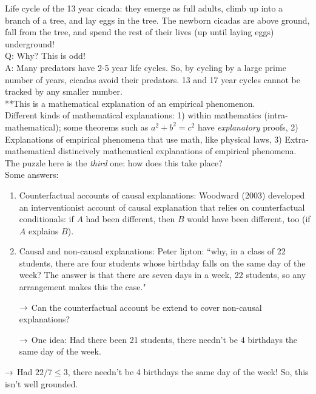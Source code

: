 Life cycle of the 13 year cicada: they emerge as full adults, climb up into a branch of a tree, and lay eggs in the tree. The newborn cicadas are above ground, fall from the tree, and spend the rest of their lives (up until laying eggs) underground! \\

Q: Why? This is odd! \\

A: Many predators have 2-5 year life cycles. So, by cycling by a large prime number of years, cicadas avoid their predators. 13 and 17 year cycles cannot be tracked by any smaller number. \\

**This is a mathematical explanation of an empirical phenomenon. \\

Different kinds of mathematical explanations: 1) within mathematics (intra-mathematical); some theorems such as $a^2 + b^2 = c^2$ have {\it explanatory} proofs, 2) Explanations of empirical phenomena that use math, like physical laws, 3) Extra-mathematical distincively mathematical explanations of empirical phenomena. \\

The puzzle here is the {\it third} one: how does this take place? \\

Some answers:
\begin{enumerate}
	\item Counterfactual accounts of causal explanations: Woodward (2003) developed an interventionist account of causal explanation that relies on counterfactual conditionals: if $A$ had been different, then $B$ would have been different, too (if $A$ explains $B$).
	\item Causal and non-causal explanations: Peter lipton: ``why, in a class of 22 students, there are four students whose birthday falls on the same day of the week? The answer is that there are seven days in a week, 22 students, so any arrangement makes this the case." 

	$\rightarrow$ Can the counterfactual account be extend to cover non-causal explanations?

	$\rightarrow$ One idea: Had there been 21 students, there needn't be 4 birthdays the same day of the week.
\end{enumerate}

$\rightarrow$ Had $22/7 \leq 3$, there needn't be 4 birthdays the same day of the week! So, this isn't well grounded. \\


